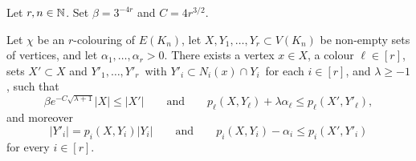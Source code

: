 
  \begin{lemma}
    \label{lem:key-lemma}

    Let $r, n\in\mathbb{N}$. Set $\beta = 3^{-4r}$ and $C = 4r^{3/2}$.

    Let\/ $\chi$ be an\/ $r$-colouring of\/ $E(K_n)$, let\/ $X,Y_1,\ldots,Y_r \subset V(K_n)$ be non-empty sets of vertices, and let $\alpha_1,\ldots,\alpha_r > 0$. There exists a vertex $x \in X$, a colour $\ell \in [r]$, sets $X' \subset X$ and\/ $Y'_1,\ldots,Y'_r\,$ with\/ $Y'_i \subset N_i(x) \cap Y_i\,$ for each $i \in [r]$, and\/ $\lambda \ge -1$, such that
    \begin{equation}\label{eq:key:ell}
      \beta e^{- C \sqrt{\lambda + 1}} |X| \le |X'| \qquad \text{and} \qquad p_\ell(X,Y_\ell) + \lambda \alpha_\ell \le p_\ell( X', Y'_\ell ) ,
    \end{equation}
    and moreover
    \begin{equation}\label{eq:key:alli}
      |Y'_i| = p_i(X,Y_i) |Y_i| \qquad \text{and} \qquad  p_i(X,Y_i) - \alpha_i \le p_i( X', Y'_i )
    \end{equation}
    for every $i \in [r]$.
  \end{lemma}


